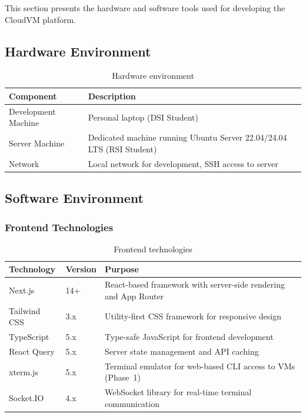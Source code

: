 This section presents the hardware and software tools used for developing the CloudVM platform.

\subsection{Hardware Environment}

\begin{table}[H]
\centering
\caption{Hardware environment}
\label{tab:hardware}
\begin{tabularx}{\textwidth}{|l|X|}
\hline
\rowcolor{blue!15}
\textbf{Component} & \textbf{Description} \\
\hline
Development Machine & Personal laptop (DSI Student) \\
\hline
Server Machine & Dedicated machine running Ubuntu Server 22.04/24.04 LTS (RSI Student) \\
\hline
Network & Local network for development, SSH access to server \\
\hline
\end{tabularx}
\end{table}

\subsection{Software Environment}

\subsubsection{Frontend Technologies}

\begin{table}[H]
\centering
\caption{Frontend technologies}
\label{tab:frontend-tech}
\begin{tabularx}{\textwidth}{|l|l|X|}
\hline
\rowcolor{blue!15}
\textbf{Technology} & \textbf{Version} & \textbf{Purpose} \\
\hline
Next.js & 14+ & React-based framework with server-side rendering and App Router \\
\hline
Tailwind CSS & 3.x & Utility-first CSS framework for responsive design \\
\hline
TypeScript & 5.x & Type-safe JavaScript for frontend development \\
\hline
React Query & 5.x & Server state management and API caching \\
\hline
xterm.js & 5.x & Terminal emulator for web-based CLI access to VMs (Phase~1) \\
\hline
Socket.IO & 4.x & WebSocket library for real-time terminal communication \\
\hline
\end{tabularx}
\end{table}

